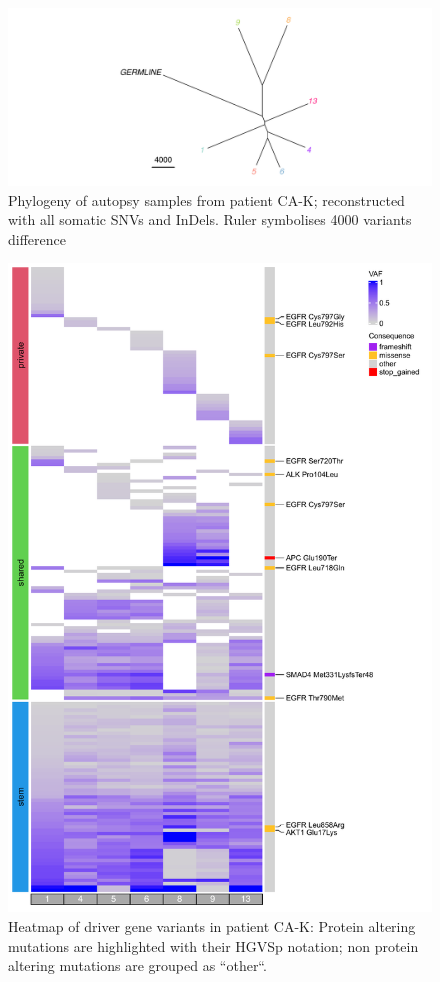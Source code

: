 \begin{figure}[ht]
	\centering
	\includegraphics[width=.99\linewidth]{Figures/CASCADE/CA82/CA82phylo.pdf}
	\caption[Phylogeny of autopsy samples from patient CA-K]{Phylogeny of autopsy samples from patient CA-K; reconstructed with all somatic SNVs and InDels. Ruler symbolises 4000 variants difference} \label{fig:ca82phylo}
\end{figure}


\begin{figure}[htp]
\centering
\includegraphics[width=.99\linewidth]{Figures/CASCADE/CA82/CA82varHeatmap.pdf}
\caption[Heatmap of driver gene variants in patient CA-K]{Heatmap of driver gene variants in patient CA-K: Protein altering mutations are highlighted with their HGVSp notation; non protein altering mutations are grouped as ``other``.} \label{fig:ca82heatmap}
\end{figure}


